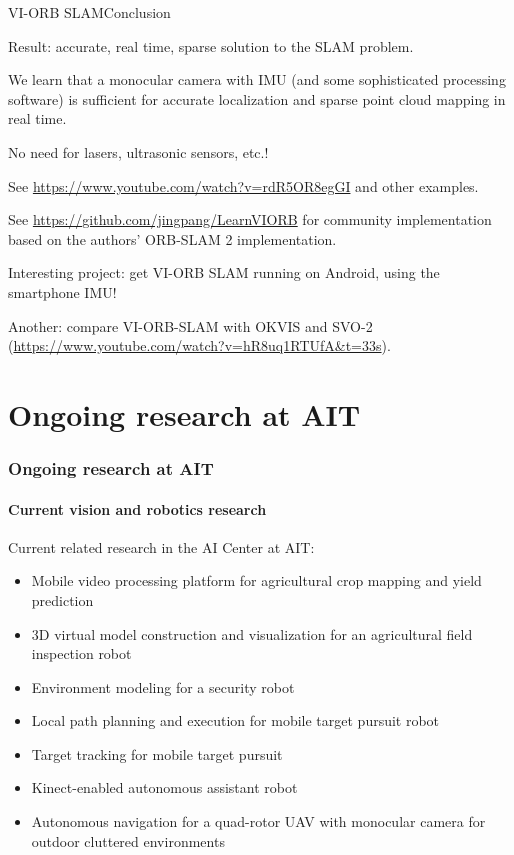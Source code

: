 \documentclass[aspectratio=169]{beamer}
\begin{document}
\begin{frame}{VI-ORB SLAM}{Conclusion}

Result: \alert{accurate},
\alert{real time}, \alert{sparse} solution to the
SLAM problem.

\medskip

We learn that a monocular camera with IMU (and some sophisticated
processing software) is sufficient for accurate localization
and sparse point cloud mapping in real time.

\medskip

No need for lasers, ultrasonic sensors, etc.!

\medskip

See \url{https://www.youtube.com/watch?v=rdR5OR8egGI} and other examples.

\medskip

See \url{https://github.com/jingpang/LearnVIORB} for community
implementation based on the authors' ORB-SLAM 2 implementation.

\medskip

Interesting project: get VI-ORB SLAM running on Android, using the
smartphone IMU!

\medskip

Another: compare VI-ORB-SLAM with OKVIS and SVO-2 (\url{https://www.youtube.com/watch?v=hR8uq1RTUfA&t=33s}).

\end{frame}


\section{Ongoing research at AIT}

\begin{frame}
\frametitle{Ongoing research at AIT} \framesubtitle{Current vision and
  robotics research}

Current related research in the AI Center at AIT:
\begin{itemize}
\item Mobile video processing platform for agricultural crop mapping and
  yield prediction
\item 3D virtual model construction and visualization for an agricultural 
  field inspection robot 
\item Environment modeling for a security robot
\item Local path planning and execution for mobile target pursuit robot
\item Target tracking for mobile target pursuit
\item Kinect-enabled autonomous assistant robot
\item Autonomous navigation for a quad-rotor UAV with
  monocular camera for outdoor cluttered environments
\end{itemize}

\end{frame}
\end{document}
